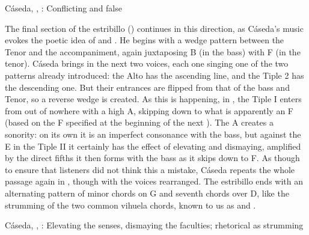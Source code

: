 
{Cáseda, , : Conflicting
 and false }

The final section of the estribillo
() continues in this direction,
as Cáseda's music evokes the poetic idea of  and
.
He begins with a wedge pattern between the Tenor and the accompaniment, again
juxtaposing B\fl{} (in the bass) with F\sh{} (in the tenor).
Cáseda brings in the next two voices, each one singing one of the two patterns
already introduced: the Alto has the ascending line, and the Tiple 2 has the
descending one.
But their entrances are flipped from that of the bass and Tenor, so a reverse
wedge is created.
As this is happening, in , the Tiple I enters from out of nowhere
with a high A, skipping down to what is apparently an F\na{} (based on the
F\sh{} specified at the beginning of the next ).
The A creates a  sonority: on its own it is an imperfect
consonance with the bass, but against the E\fl{} in the Tiple II it certainly
has the effect of elevating and dismaying, amplified by the direct fifths it
then forms with the bass as it skips down to F.
As though to ensure that listeners did not think this a mistake, Cáseda repeats
the whole passage again in , though with the voices rearranged.
The estribillo ends with an alternating pattern of minor chords on G and
seventh chords over D, like the strumming of the two common vihuela chords,
known to us as  and .

{Cáseda, , : Elevating the senses,
dismaying the faculties; rhetorical  as strumming}


